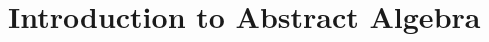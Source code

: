 \newcommand{\subgroup}{\le}
\newcommand{\subfield}{\le}
\newcommand{\isomorphism}{\simeq}






\section{Introduction to Abstract Algebra}
%

